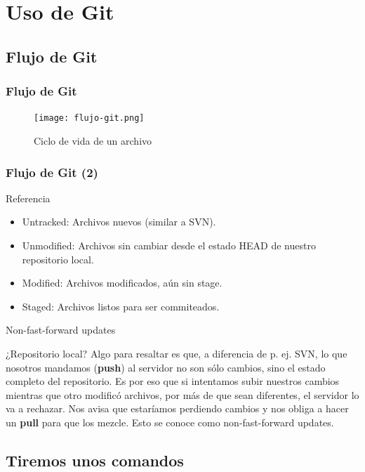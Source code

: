\documentclass{beamer}
\begin{document}
\section{Uso de Git}

\subsection{Flujo de Git}

\begin{frame}\frametitle{Flujo de Git}
  \begin{figure}
    \texttt{[image: flujo-git.png]} 
    \caption{Ciclo de vida de un archivo}
  \end{figure}
\end{frame}

\begin{frame}\frametitle{Flujo de Git (2)}
  
  \begin{block}{Referencia}
    \begin{itemize}
    \item \alert{Untracked:} Archivos nuevos (similar a SVN). \pause
    \item \alert{Unmodified:} Archivos sin cambiar desde el estado HEAD de nuestro repositorio local. \pause
    \item \alert{Modified:} Archivos modificados, aún sin stage. \pause
    \item \alert{Staged:} Archivos listos para ser commiteados.
    \end{itemize}
  \end{block}
  
\end{frame}

\begin{frame}{Non-fast-forward updates}
  \begin{block}{¿Repositorio local? }
    Algo para resaltar es que, a diferencia de p. ej. SVN, lo que nosotros mandamos (\textbf{push}) al servidor no son sólo cambios, sino
    el estado completo del repositorio. Es por eso que si intentamos subir nuestros cambios mientras que otro modificó archivos,
    por más de que sean diferentes, el servidor lo va a rechazar. Nos avisa que estaríamos perdiendo cambios y nos obliga
    a hacer un \textbf{pull} para que los mezcle. Esto se conoce como non-fast-forward updates.
  \end{block}
\end{frame}

\subsection{Tiremos unos comandos}
\end{document}
